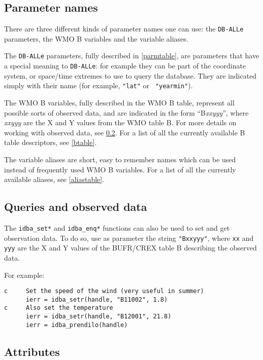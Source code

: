 \documentclass[final,12pt,a4paper,twoside]{book}
\newcommand{\dballe}{{\tt DB-ALLe}}
\begin{document}
\subsection {Parameter names}

There are three different kinds of parameter names one can use: the \dballe{}
parameters, the WMO B variables and the variable aliases.

The \dballe{} parameters, fully described in \ref{parmtable}, are parameters
that have a special meaning to \dballe{}: for example they can be part of the
coordinate system, or space/time extremes to use to query the database.  They
are indicated simply with their name (for example, {\tt "lat"} or {\tt
"yearmin"}).

The WMO B variables, fully described in the WMO B table, represent all possible
sorts of observed data, and are indicated in the form ``B{\itshape xxyyy}'',
where {\itshape xxyyy} are the X and Y values from the WMO table B.  For more
details on working with observed data, see \ref{obsdata}.  For a list of all
the currently available B table descriptors, see \ref{btable}.

The variable aliases are short, easy to remember names which can be used
instead of frequently used WMO B variables.  For a list of all the currently
available aliases, see \ref{aliastable}.

\subsection{Queries and observed data}
\label{obsdata}

The {\tt idba\_set*} and {\tt idba\_enq*} functions can also be used to set and get
observation data.  To do so, use as parameter the string {\tt "Bxxyyy"}, where
{\tt xx} and {\tt yyy} are the X and Y values of the BUFR/CREX table B describing
the observed data.

For example:

\begin{verbatim}
c     Set the speed of the wind (very useful in summer)
      ierr = idba_setr(handle, "B11002", 1.8)
c     Also set the temperature
      ierr = idba_setr(handle, "B12001", 21.8)
      ierr = idba_prendilo(handle)
\end{verbatim}


\subsection{Attributes}
\end{document}
